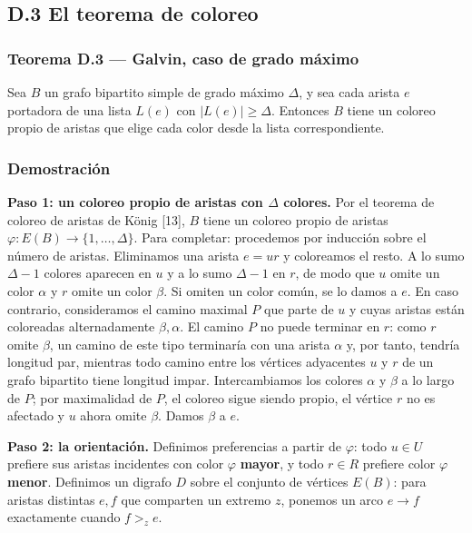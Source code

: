 \documentclass[
  spanish,
  11pt,
  a4paper,
]{article}
\begin{document}
\subsection{D.3 El teorema de coloreo}\label{d.3-el-teorema-de-coloreo}

\subsubsection{Teorema D.3 --- Galvin, caso de grado máximo}\label{teorema-d.3-galvin-caso-de-grado-muxe1ximo}

Sea \(B\) un grafo bipartito simple de grado máximo \(\Delta\), y sea cada arista \(e\) portadora de una lista \(L(e)\) con \(|L(e)|\ge\Delta\). Entonces \(B\) tiene un coloreo propio de aristas que elige cada color desde la lista correspondiente.

\subsubsection{Demostración}\label{demostraciuxf3n-11}

\textbf{Paso 1: un coloreo propio de aristas con \(\Delta\) colores.} Por el teorema de coloreo de aristas de König {[}13{]}, \(B\) tiene un coloreo propio de aristas \(\varphi:E(B)\to\{1,\ldots,\Delta\}\). Para completar: procedemos por inducción sobre el número de aristas. Eliminamos una arista \(e=ur\) y coloreamos el resto. A lo sumo \(\Delta-1\) colores aparecen en \(u\) y a lo sumo \(\Delta-1\) en \(r\), de modo que \(u\) omite un color \(\alpha\) y \(r\) omite un color \(\beta\). Si omiten un color común, se lo damos a \(e\). En caso contrario, consideramos el camino maximal \(P\) que parte de \(u\) y cuyas aristas están coloreadas alternadamente \(\beta,\alpha\). El camino \(P\) no puede terminar en \(r\): como \(r\) omite \(\beta\), un camino de este tipo terminaría con una arista \(\alpha\) y, por tanto, tendría longitud par, mientras todo camino entre los vértices adyacentes \(u\) y \(r\) de un grafo bipartito tiene longitud impar. Intercambiamos los colores \(\alpha\) y \(\beta\) a lo largo de \(P\); por maximalidad de \(P\), el coloreo sigue siendo propio, el vértice \(r\) no es afectado y \(u\) ahora omite \(\beta\). Damos \(\beta\) a \(e\).

\textbf{Paso 2: la orientación.} Definimos preferencias a partir de \(\varphi\): todo \(u\in U\) prefiere sus aristas incidentes con color \(\varphi\) \textbf{mayor}, y todo \(r\in R\) prefiere color \(\varphi\) \textbf{menor}. Definimos un digrafo \(D\) sobre el conjunto de vértices \(E(B)\): para aristas distintas \(e,f\) que comparten un extremo \(z\), ponemos un arco \(e\to f\) exactamente cuando \(f>_ze\).
\end{document}
